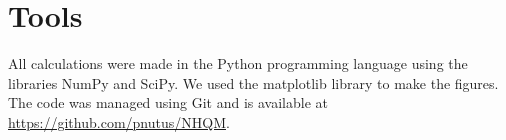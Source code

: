 

\section{Tools}

All calculations were made in the Python programming language using the libraries NumPy and SciPy. We used the matplotlib library to make the figures. The code was managed using Git and is available at \url{https://github.com/pnutus/NHQM}.